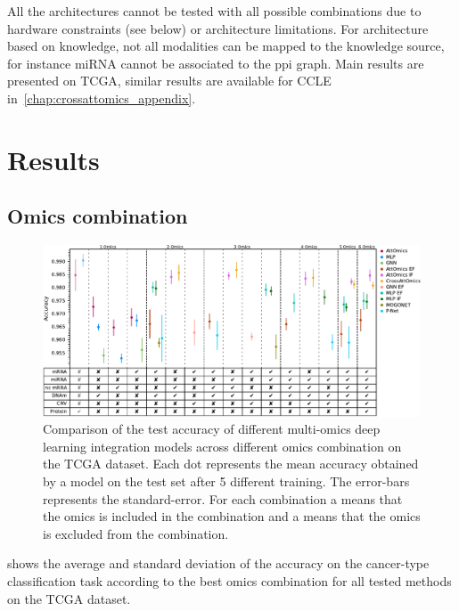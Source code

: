 \documentclass[../main.tex]{subfiles}
\begin{document}
     All the architectures cannot be tested with all possible combinations due to hardware constraints (see below) or architecture limitations.
     For architecture based on knowledge, not all modalities can be mapped to the knowledge source, for instance miRNA cannot be associated to the \gls{ppi} graph.
     Main results are presented on TCGA, similar results are available for CCLE in~\cref{chap:crossattomics_appendix}.

\section{Results}

 \subsection{Omics combination}
    \begin{figure}[htbp]
        \centering
        \includegraphics[width=1\textwidth]{tcga_perf_omics_comb.pdf}
        \caption{Comparison of the test accuracy of different multi-omics deep learning integration models across different omics combination on the TCGA dataset. Each dot represents the mean accuracy obtained by a model on the test set after 5 different training. The error-bars represents the standard-error. For each combination a \cmark means that the omics is included in the combination and a \xmark means that the omics is excluded from the combination.}
        \label{fig:tcga_perf_comb}
    \end{figure}
      shows the average and standard deviation of the accuracy on the cancer-type classification task according to the best omics combination for all tested methods on the TCGA dataset.
\end{document}
